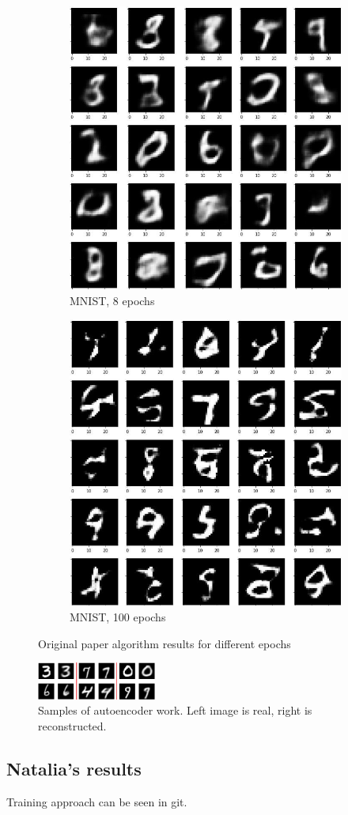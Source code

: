 \documentclass{article}
\begin{document}
    \begin{center}
        \begin{figure}[H]{\textwidth}
            \begin{subfigure}{0.5\textwidth}
                \centering
                \includegraphics[width=0.35\linewidth]{figures/epoch8.png}
                \caption{MNIST, 8 epochs}
            \end{subfigure}
            \begin{subfigure}{0.5\textwidth}
                \centering
                \includegraphics[width=0.35\linewidth]{figures/epoch100.png}
                \caption{MNIST, 100 epochs}
            \end{subfigure}%
            \caption{Original paper algorithm results for different epochs}
        \end{figure}
    \end{center}
    \begin{center}
        \begin{figure}[H]
            \centering
            \includegraphics[width=0.35\textwidth]{figures/aae_sampling_real_reconstructed.png}
            \caption{Samples of autoencoder work. Left image is real, right is reconstructed.}
        \end{figure}
    \end{center}
    \subsection{Natalia's results}
    Training approach can be seen in git.
\end{document}
